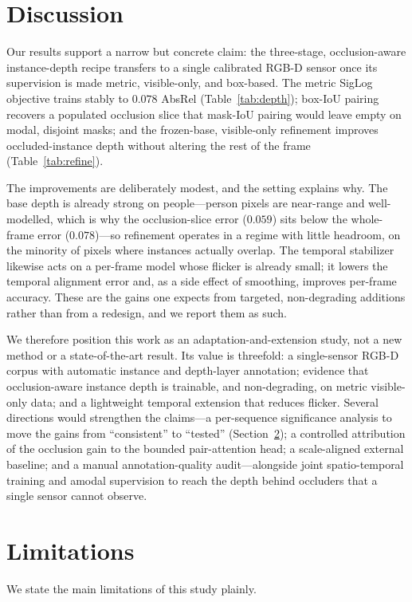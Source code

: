\documentclass[sigconf, review=true]{acmart}
\begin{document}
\section{Discussion}
\label{sec:discussion}
Our results support a narrow but concrete claim: the three-stage,
occlusion-aware instance-depth recipe transfers to a single calibrated RGB-D
sensor once its supervision is made metric, visible-only, and box-based. The
metric SigLog objective trains stably to $0.078$ AbsRel
(Table~\ref{tab:depth}); box-IoU pairing recovers a populated occlusion slice
that mask-IoU pairing would leave empty on modal, disjoint masks; and the
frozen-base, visible-only refinement improves occluded-instance depth without
altering the rest of the frame (Table~\ref{tab:refine}).

The improvements are deliberately modest, and the setting explains why. The base
depth is already strong on people---person pixels are near-range and
well-modelled, which is why the occlusion-slice error ($0.059$) sits below the
whole-frame error ($0.078$)---so refinement operates in a regime with little
headroom, on the minority of pixels where instances actually overlap. The
temporal stabilizer likewise acts on a per-frame model whose flicker is already
small; it lowers the temporal alignment error and, as a side effect of
smoothing, improves per-frame accuracy. These are the gains one expects from
targeted, non-degrading additions rather than from a redesign, and we report
them as such.

We therefore position this work as an adaptation-and-extension study, not a new
method or a state-of-the-art result. Its value is threefold: a single-sensor
RGB-D corpus with automatic instance and depth-layer annotation; evidence that
occlusion-aware instance depth is trainable, and non-degrading, on metric
visible-only data; and a lightweight temporal extension that reduces flicker.
Several directions would strengthen the claims---a per-sequence significance
analysis to move the gains from ``consistent'' to ``tested''
(Section~\ref{sec:limitations}); a controlled attribution of the occlusion gain
to the bounded pair-attention head; a scale-aligned external baseline; and a
manual annotation-quality audit---alongside joint spatio-temporal training and
amodal supervision to reach the depth behind occluders that a single sensor
cannot observe.

\section{Limitations}
\label{sec:limitations}
We state the main limitations of this study plainly.
\end{document}
